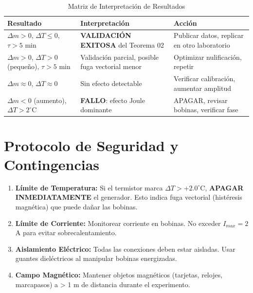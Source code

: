 \documentclass[12pt, a4paper]{article}
\begin{document}
\begin{table}[h!]
\centering
\caption{Matriz de Interpretación de Resultados}
\begin{tabular}{@{}p{4cm}p{4cm}p{5cm}@{}}
\toprule
\textbf{Resultado} & \textbf{Interpretación} & \textbf{Acción} \\ \midrule
$\Delta m > 0$, $\Delta T \leq 0$, $\tau > 5$ min & \textbf{VALIDACIÓN EXITOSA} del Teorema 02 & Publicar datos, replicar en otro laboratorio \\ \addlinespace
$\Delta m > 0$, $\Delta T > 0$ (pequeño), $\tau > 5$ min & Validación parcial, posible fuga vectorial menor & Optimizar nulificación, repetir \\ \addlinespace
$\Delta m \approx 0$, $\Delta T \approx 0$ & Sin efecto detectable & Verificar calibración, aumentar amplitud \\ \addlinespace
$\Delta m < 0$ (aumento), $\Delta T > 2^\circ$C & \textbf{FALLO}: efecto Joule dominante & APAGAR, revisar bobinas, verificar fase \\ \bottomrule
\end{tabular}
\end{table}

\section{Protocolo de Seguridad y Contingencias}

\begin{tcolorbox}[
    colback=alertred!10,
    colframe=alertred,
    title=\textbf{\textcolor{alertred}{⚠️ REGLAS DE SEGURIDAD CRÍTICAS}},
    fonttitle=\bfseries,
    boxrule=1.5pt
]
\begin{enumerate}
    \item \textbf{Límite de Temperatura:} Si el termistor marca $\Delta T > +2.0^\circ$C, \textbf{APAGAR INMEDIATAMENTE} el generador. Esto indica fuga vectorial (histéresis magnética) que puede dañar las bobinas.
    
    \item \textbf{Límite de Corriente:} Monitorear corriente en bobinas. No exceder $I_{max} = 2$ A para evitar sobrecalentamiento.
    
    \item \textbf{Aislamiento Eléctrico:} Todas las conexiones deben estar aisladas. Usar guantes dieléctricos al manipular bobinas energizadas.
    
    \item \textbf{Campo Magnético:} Mantener objetos magnéticos (tarjetas, relojes, marcapasos) a > 1 m de distancia durante el experimento.
\end{enumerate}
\end{tcolorbox}
\end{document}
